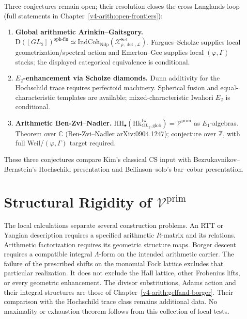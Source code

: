 Three conjectures remain open; their resolution closes the
cross-Langlands loop (full statements in
Chapter~\ref{v4-arith:open-frontiers}):
\begin{enumerate}
\item \textbf{Global arithmetic Arinkin--Gaitsgory.}
\(\mathrm{D}([GL_{2}])^{\mathrm{sph\text{-}fin}}\simeq\mathrm{IndCoh}_{\mathrm{Nilp}}(\mathcal{X}^{\mathrm{Sel}}_{\bar\rho,\det,\mathcal{L}})\).
Fargues--Scholze supplies local geometrization/spectral action and
Emerton--Gee supplies local \((\varphi,\Gamma)\) stacks; the displayed
categorical equivalence is conditional.
\item \textbf{\(E_{2}\)-enhancement via Scholze diamonds.}
Dunn additivity for the Hochschild trace requires perfectoid
machinery. Spherical fusion and equal-characteristic templates are
available; mixed-characteristic Iwahori \(E_{2}\) is conditional.
\item \textbf{Arithmetic Ben-Zvi--Nadler.}
\(\mathrm{HH}_{\bullet}(\mathrm{Hk}^{\mathrm{Iw}}_{GL_{2},\mathrm{glob}})=\mathcal{V}^{\mathrm{prim}}\)
as \(E_{1}\)-algebras. Theorem over \(\mathbb{C}\) (Ben-Zvi--Nadler
arXiv:0904.1247); conjecture over \(\mathbb{Z}\), with full
Weil/\((\varphi,\Gamma)\) target required.
\end{enumerate}

These three conjectures compare Kim's classical CS input with
Bezrukavnikov--Bernstein's Hochschild presentation and
Beilinson--solo's bar--cobar presentation.

\section{Structural Rigidity of \(\mathcal{V}^{\mathrm{prim}}\)}
\label{v4-arith:syn:process-discovery}

\begin{remark}
\label{v4-arith:thm:fifteen-construction-convergence}
The local calculations separate several construction problems.
An RTT or Yangian description requires a specified arithmetic
\(R\)-matrix and its relations. Arithmetic factorization requires its
geometric structure maps. Borger descent requires a compatible integral
\(\Lambda\)-form on the intended arithmetic carrier.
The failure of the prescribed shifts on the monomial Fock lattice
excludes that particular realization. It does not exclude the Hall
lattice, other Frobenius lifts, or every geometric enhancement.
The divisor substitutions, Adams action and their integral structures
are those of Chapter~\ref{v4-arith:gelfand-borger}. Their comparison with
the Hochschild trace class remains additional data. No maximality or
exhaustion theorem follows from this collection of local tests.
\end{remark}

